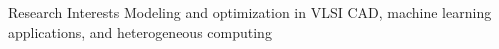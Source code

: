 
\begin{rSection}{Research Interests}
    Modeling and optimization in VLSI CAD, machine learning applications, and heterogeneous computing 
\end{rSection}


